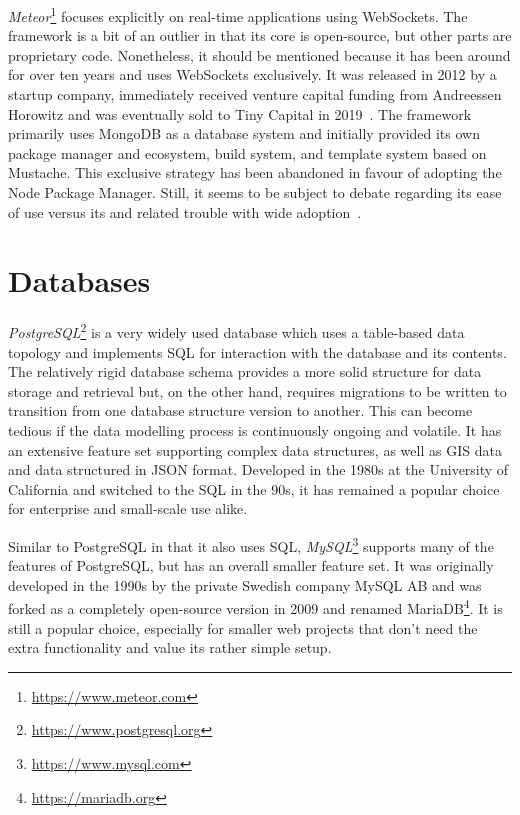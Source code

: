 \emph{Meteor}\footnote{\url{https://www.meteor.com}} focuses explicitly on real-time applications using WebSockets.
The framework is a bit of an outlier in that its core is open-source, but other parts are proprietary code.
Nonetheless, it should be mentioned because it has been around for over ten years and uses WebSockets exclusively.
It was released in 2012 by a startup company, immediately received venture capital funding from Andreessen Horowitz and was eventually sold to Tiny Capital in 2019~\parencite{meteorSaleTinyCapital}.
The framework primarily uses MongoDB as a database system and initially provided its own package manager and ecosystem, build system, and template system based on Mustache.
This exclusive strategy has been abandoned in favour of adopting the Node Package Manager.
Still, it seems to be subject to debate regarding its ease of use versus its  and related trouble with wide adoption~\parencite{meteorDiscussionYCombinator}.


\section{Databases}
\label{sec:databases}





\emph{PostgreSQL}\footnote{\url{https://www.postgresql.org}} is a very widely used database which uses a table-based data topology and implements \ac{SQL} for interaction with the database and its contents.
The relatively rigid database schema provides a more solid structure for data storage and retrieval but, on the other hand, requires migrations to be written to transition from one database structure version to another.
This can become tedious if the data modelling process is continuously ongoing and volatile.
It has an extensive feature set supporting complex data structures, as well as \ac{GIS} data and data structured in \ac{JSON} format.
Developed in the 1980s at the University of California and switched to the \ac{SQL} in the 90s, it has remained a popular choice for enterprise and small-scale use alike.

Similar to PostgreSQL in that it also uses \ac{SQL}, \emph{MySQL}\footnote{\url{https://www.mysql.com}} supports many of the features of PostgreSQL, but has an overall smaller feature set.
It was originally developed in the 1990s by the private Swedish company MySQL AB and was forked as a completely open-source version in 2009 and renamed MariaDB\footnote{\url{https://mariadb.org}}.
It is still a popular choice, especially for smaller web projects that don't need the extra functionality and value its rather simple setup.

